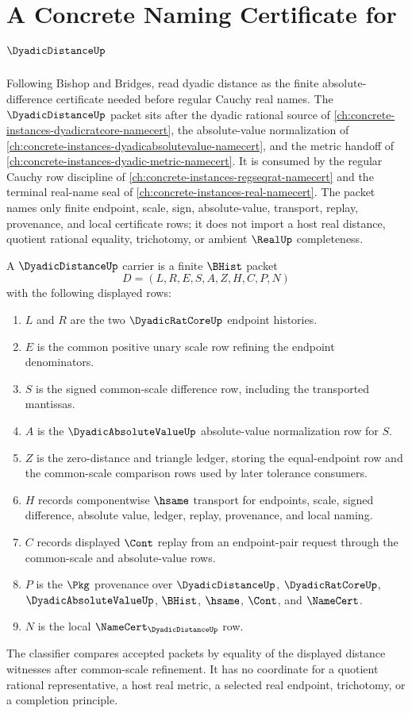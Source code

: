 \chapter{A Concrete Naming Certificate for $\DyadicDistanceUp$}
\label{ch:concrete-instances-dyadic-distance-namecert}

Following Bishop and Bridges, read dyadic distance as the finite absolute-difference certificate needed before regular Cauchy real names. The $\DyadicDistanceUp$ packet sits after the dyadic rational source of \autoref{ch:concrete-instances-dyadicratcore-namecert}, the absolute-value normalization of \autoref{ch:concrete-instances-dyadicabsolutevalue-namecert}, and the metric handoff of \autoref{ch:concrete-instances-dyadic-metric-namecert}. It is consumed by the regular Cauchy row discipline of \autoref{ch:concrete-instances-regseqrat-namecert} and the terminal real-name seal of \autoref{ch:concrete-instances-real-namecert}. The packet names only finite endpoint, scale, sign, absolute-value, transport, replay, provenance, and local certificate rows; it does not import a host real distance, quotient rational equality, trichotomy, or ambient $\RealUp$ completeness.

\begin{definition}
\label{def:dyadic-distance-carrier}
A $\DyadicDistanceUp$ carrier is a finite $\BHist$ packet
$$
D=(L,R,E,S,A,Z,H,C,P,N)
$$
with the following displayed rows:
\begin{enumerate}
\item $L$ and $R$ are the two $\DyadicRatCoreUp$ endpoint histories.
\item $E$ is the common positive unary scale row refining the endpoint denominators.
\item $S$ is the signed common-scale difference row, including the transported mantissas.
\item $A$ is the $\DyadicAbsoluteValueUp$ absolute-value normalization row for $S$.
\item $Z$ is the zero-distance and triangle ledger, storing the equal-endpoint row and the common-scale comparison rows used by later tolerance consumers.
\item $H$ records componentwise $\hsame$ transport for endpoints, scale, signed difference, absolute value, ledger, replay, provenance, and local naming.
\item $C$ records displayed $\Cont$ replay from an endpoint-pair request through the common-scale and absolute-value rows.
\item $P$ is the $\Pkg$ provenance over $\DyadicDistanceUp$, $\DyadicRatCoreUp$, $\DyadicAbsoluteValueUp$, $\BHist$, $\hsame$, $\Cont$, and $\NameCert$.
\item $N$ is the local $\NameCert_{\DyadicDistanceUp}$ row.
\end{enumerate}
The classifier compares accepted packets by equality of the displayed distance witnesses after common-scale refinement. It has no coordinate for a quotient rational representative, a host real metric, a selected real endpoint, trichotomy, or a completion principle.
\end{definition}

